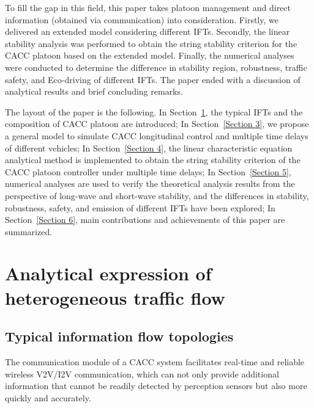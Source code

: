 \documentclass[journal]{IEEEtran}
\begin{document}
To fill the gap in this field, this paper takes platoon management and direct information (obtained via communication) into consideration. Firstly, we delivered an extended model considering different IFTs. Secondly, the linear stability analysis was performed to obtain the string stability criterion for the CACC platoon based on the extended model. Finally, the numerical analyses were conducted to determine the difference in stability region, robustness, traffic safety, and Eco-driving of different IFTs. The paper ended with a discussion of analytical results and brief concluding remarks.


The layout of the paper is the following. In Section~\ref{Section 2}, the typical IFTs and the composition of CACC platoon are introduced; In Section~\ref{Section 3}, we propose a general model to simulate CACC longitudinal control and multiple time delays of different vehicles; In Section~\ref{Section 4}, the linear characteristic equation analytical method is implemented to obtain the string stability criterion of the CACC platoon controller under multiple time delays; In Section~\ref{Section 5}, numerical analyses are used to verify the theoretical analysis results from the perspective of long-wave and short-wave stability, and the differences in stability, robustness, safety, and emission of different IFTs have been explored; In Section~\ref{Section 6}, main contributions and achievements of this paper are summarized. 

\section{Analytical expression of heterogeneous traffic flow}
\label{Section 2}
\subsection{Typical information flow topologies}
The communication module of a CACC system facilitates real-time and reliable wireless V2V/I2V communication, which can not only provide additional information that cannot be readily detected by perception sensors but also more quickly and accurately.
\end{document}
